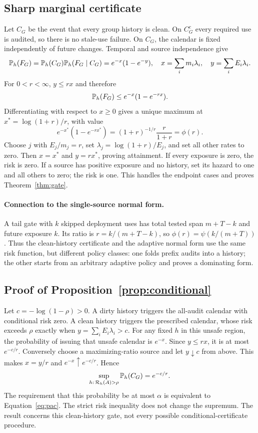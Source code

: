 \subsection{Sharp marginal certificate}
Let $C_G$ be the event that every group history is clean. On $C_G^c$ every required use is audited, so there is no stale-use failure. On $C_G$, the calendar is fixed independently of future changes. Temporal and source independence give
\begin{equation}
 \mathbb P_h(F_G)=\mathbb P_h(C_G)\mathbb P_h(F_G\mid C_G)
 =e^{-x}(1-e^{-y}),
 \quad x=\sum_i m_i\lambda_i,\quad y=\sum_i E_i\lambda_i.
\end{equation}
For $0<r<\infty$, $y\leq rx$ and therefore
\begin{equation}
 \mathbb P_h(F_G)\leq e^{-x}(1-e^{-rx}).
\end{equation}
Differentiating with respect to $x\geq0$ gives a unique maximum at $x^*=\log(1+r)/r$, with value
\begin{equation}
 e^{-x^*}(1-e^{-rx^*})=(1+r)^{-1/r}\frac{r}{1+r}=\phi(r).
\end{equation}
Choose $j$ with $E_j/m_j=r$, set $\lambda_j=\log(1+r)/E_j$, and set all other rates to zero. Then $x=x^*$ and $y=rx^*$, proving attainment. If every exposure is zero, the risk is zero. If a source has positive exposure and no history, set its hazard to one and all others to zero; the risk is one. This handles the endpoint cases and proves Theorem~\ref{thm:gate}.

\paragraph{Connection to the single-source normal form.}
A tail gate with $k$ skipped deployment uses has total tested span $m+T-k$ and future exposure $k$. Its ratio is $r=k/(m+T-k)$, so $\phi(r)=\psi(k/(m+T))$. Thus the clean-history certificate and the adaptive normal form use the same risk function, but different policy classes: one folds prefix audits into a history; the other starts from an arbitrary adaptive policy and proves a dominating form.

\subsection{Proof of Proposition~\ref{prop:conditional}}
Let $c=-\log(1-\rho)>0$. A dirty history triggers the all-audit calendar with conditional risk zero. A clean history triggers the prescribed calendar, whose risk exceeds $\rho$ exactly when $y=\sum_iE_i\lambda_i>c$. For any fixed $h$ in this unsafe region, the probability of issuing that unsafe calendar is $e^{-x}$. Since $y\leq rx$, it is at most $e^{-c/r}$. Conversely choose a maximizing-ratio source and let $y\downarrow c$ from above. This makes $x=y/r$ and $e^{-x}\uparrow e^{-c/r}$. Hence
\begin{equation}
 \sup_{h:\,\mathcal R_h(A)>\rho}\mathbb P_h(C_G)=e^{-c/r}.
\end{equation}
The requirement that this probability be at most $\alpha$ is equivalent to Equation~\eqref{eq:pac}. The strict risk inequality does not change the supremum. The result concerns this clean-history gate, not every possible conditional-certificate procedure.

